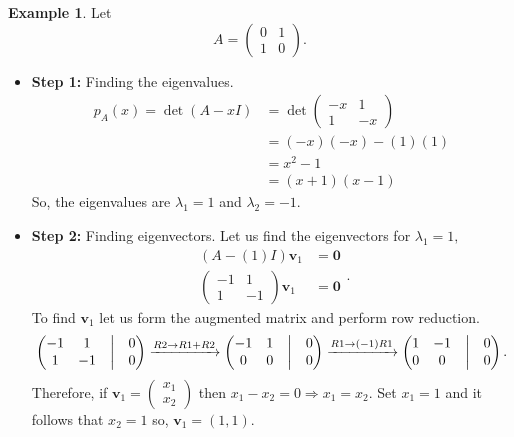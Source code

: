 \documentclass[12pt, a4paper]{article}
\newcommand{\imply}{\Rightarrow}
\theoremstyle{definition}
\newtheorem*{example}{Example}
\theoremstyle{plain}
\begin{document}
\begin{example}
Let $$A=\begin{pmatrix} 0 & 1 \\ 1 & 0 \end{pmatrix}.$$

\begin{itemize}

	\item \textbf{Step 1:} Finding the eigenvalues. $$\begin{aligned} p_A(x)=\det(A-xI) &= \det \begin{pmatrix} -x & 1 \\ 1 & -x \end{pmatrix} \\
	&=(-x)(-x)-(1)(1) \\
	&=x^2-1 \\
	&= (x+1)(x-1)
	\end{aligned}$$ So, the eigenvalues are $\lambda_1=1$ and $\lambda_2=-1.$

	\item \textbf{Step 2:} Finding eigenvectors. Let us find the eigenvectors for $\lambda_1=1,$ $$\begin{aligned}(A-(1)I)\mathbf{v}_1&=\mathbf{0} \\
	\begin{pmatrix} -1 & 1 \\ 1 & -1 \end{pmatrix}\mathbf{v}_1&=\mathbf{0} \end{aligned}.$$ To find $\mathbf{v}_1$ let us form the augmented matrix and perform row reduction. $$\begin{pmatrix} -1 & 1 & \bigm| & 0 \\1 & -1 & \bigm| & 0 \\ \end{pmatrix} \xrightarrow{R2 \to R1+R2} \begin{pmatrix} -1 & 1 & \bigm| & 0 \\0 & 0 & \bigm| & 0 \\ \end{pmatrix} \xrightarrow{R1 \to (-1)R1} \begin{pmatrix} 1 & -1 & \bigm| & 0 \\0 & 0 & \bigm| & 0 \\ \end{pmatrix}.$$ Therefore, if $\mathbf{v}_1=\begin{pmatrix} x_1 \\ x_2 \end{pmatrix}$ then $x_1-x_2=0 \imply x_1 = x_2.$ Set $x_1=1$ and it follows that $x_2=1$ so, $\mathbf{v}_1 = (1,1).$


\end{itemize}
\end{example}
\end{document}
